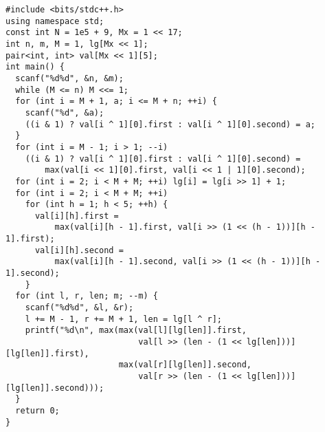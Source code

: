 \documentclass[]{article}
\begin{document}
\begin{verbatim}
#include <bits/stdc++.h>
using namespace std;
const int N = 1e5 + 9, Mx = 1 << 17;
int n, m, M = 1, lg[Mx << 1];
pair<int, int> val[Mx << 1][5];
int main() {
  scanf("%d%d", &n, &m);
  while (M <= n) M <<= 1;
  for (int i = M + 1, a; i <= M + n; ++i) {
    scanf("%d", &a);
    ((i & 1) ? val[i ^ 1][0].first : val[i ^ 1][0].second) = a;
  }
  for (int i = M - 1; i > 1; --i)
    ((i & 1) ? val[i ^ 1][0].first : val[i ^ 1][0].second) =
        max(val[i << 1][0].first, val[i << 1 | 1][0].second);
  for (int i = 2; i < M + M; ++i) lg[i] = lg[i >> 1] + 1;
  for (int i = 2; i < M + M; ++i)
    for (int h = 1; h < 5; ++h) {
      val[i][h].first =
          max(val[i][h - 1].first, val[i >> (1 << (h - 1))][h - 1].first);
      val[i][h].second =
          max(val[i][h - 1].second, val[i >> (1 << (h - 1))][h - 1].second);
    }
  for (int l, r, len; m; --m) {
    scanf("%d%d", &l, &r);
    l += M - 1, r += M + 1, len = lg[l ^ r];
    printf("%d\n", max(max(val[l][lg[len]].first,
                           val[l >> (len - (1 << lg[len]))][lg[len]].first),
                       max(val[r][lg[len]].second,
                           val[r >> (len - (1 << lg[len]))][lg[len]].second)));
  }
  return 0;
}
\end{verbatim}
\end{document}

